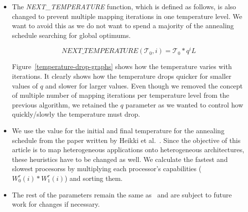 \begin{itemize}
\item The \textit{NEXT\_TEMPERATURE} function, which is defined as follows, is
also changed to prevent multiple mapping iterations in one temperature level. We
want to avoid this as we do not want to spend a majority of the annealing
schedule searching for global optimums. 

\begin{equation}
\textit{NEXT\_TEMPERATURE}(\mathcal{T}_0, i) = \mathcal{T}_0*q^{i}{L}
\end{equation}

Figure~\ref{temperature-drop-graphs} shows how the temperature varies with
iterations. It clearly shows how the temperature drops quicker for smaller
values of $q$ and slower for larger values. Even though we removed the concept
of multiple number of mapping iterations per temperature level from the previous
algorithm, we retained the $q$ parameter as we wanted to control how
quickly/slowly the temperature must drop.

\item We use the value for the initial and final temperature for the annealing
schedule from the paper written by Heikki et al.~\cite{hors06}. Since the
objective of this article is to map heterogeneous applications onto
heterogeneous architectures, these heuristics have to be changed as well. We 
calculate the fastest and slowest procesorss by multiplying each processor's
capabilities ($W^r_0(i) * W^r_1(i)$) and sorting them. 

\item The rest of the parameters remain the same as~\cite{hors06} and are subject to future work
for changes if necessary.

\end{itemize} 

